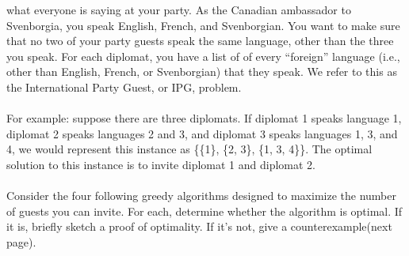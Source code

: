 \documentclass[12pt]{article}
\begin{document}
    what everyone is saying at your party. As the Canadian 
    ambassador to Svenborgia, you speak English,
    French, and Svenborgian. You want to make sure 
    that no two of your party guests speak the same language,
    other than the three you speak. For each diplomat, 
    you have a list of of every “foreign” language (i.e.,
    other than English, French, or Svenborgian) that they 
    speak. We refer to this as the International Party
    Guest, or IPG, problem.\\\\
    For example: suppose there 
    are three diplomats. If 
    diplomat 1 speaks language 
    1, diplomat 2 speaks
    languages 2 and 3, and diplomat 
    3 speaks languages 1, 3, and 4, we 
    would represent this instance as
    \{\{1\}, \{2, 3\}, \{1, 3, 4\}\}. 
    The optimal solution to this instance 
    is to invite diplomat 1 and diplomat 2.\\\\
    Consider the four following greedy algorithms 
    designed to maximize the number of guests you 
    can invite. For each, determine whether the 
    algorithm is optimal. If it is, briefly sketch a 
    proof of optimality. If
    it’s not, give a counterexample(next page).
    \newpage
\end{document}
